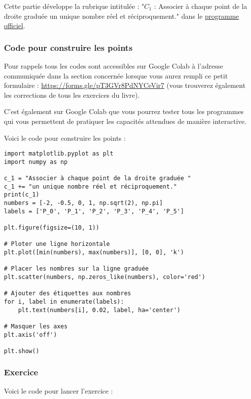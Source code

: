 \documentclass[a4paper, 11pt, twoside]{article}
\begin{document}
\startcontents[level-2]

Cette partie développe la rubrique intitulée : "\(C_1\) : Associer à
chaque point de la droite graduée un unique nombre réel et
réciproquement." dans le \href{https://eduscol.education.fr/document/24553/download}{programme officiel}.

\subsubsection{Code pour construire les points}
\label{sec:org889a2ea}

Pour rappels tous les codes sont accessibles sur Google Colab à
l'adresse communiquée dans la section concernée lorsque vous
aurez rempli ce petit formulaire :
\url{https://forms.gle/pT3GVr8PdNYCeVir7} (vous trouverez également
les corrections de tous les exercices du livre).

C'est également sur Google Colab que vous pourrez tester tous les
programmes qui vous permettent de pratiquer les capacités attendues
de manière interactive.

Voici le code pour construire les points :

\begin{verbatim}
import matplotlib.pyplot as plt
import numpy as np

c_1 = "Associer à chaque point de la droite graduée "
c_1 += "un unique nombre réel et réciproquement."
print(c_1)
numbers = [-2, -0.5, 0, 1, np.sqrt(2), np.pi]
labels = ['P_0', 'P_1', 'P_2', 'P_3', 'P_4', 'P_5']

plt.figure(figsize=(10, 1))

# Ploter une ligne horizontale
plt.plot([min(numbers), max(numbers)], [0, 0], 'k')

# Placer les nombres sur la ligne graduée
plt.scatter(numbers, np.zeros_like(numbers), color='red')

# Ajouter des étiquettes aux nombres
for i, label in enumerate(labels):
    plt.text(numbers[i], 0.02, label, ha='center')

# Masquer les axes
plt.axis('off')

plt.show()
\end{verbatim}

\subsubsection{Exercice}
\label{sec:orgd573e54}
Voici le code pour lancer l'exercice :
\end{document}
